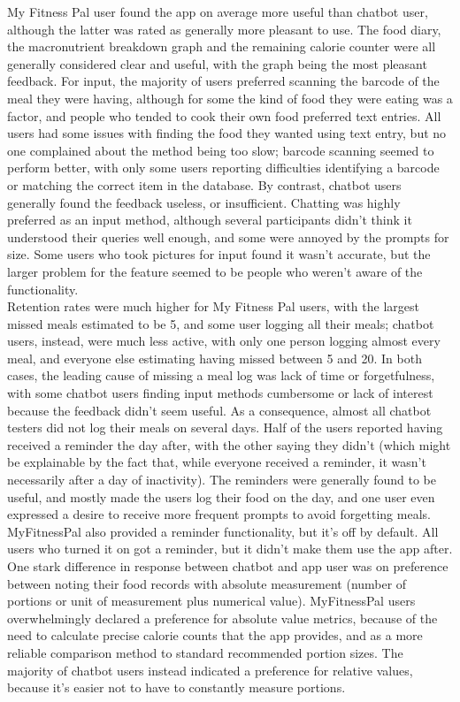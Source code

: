 My Fitness Pal user found the app on average more useful than chatbot user, although the latter was rated as generally more pleasant to use. The food diary, the macronutrient breakdown graph and the remaining calorie counter were all generally considered clear and useful, with the graph being the most pleasant feedback. For input, the majority of users preferred scanning the barcode of the meal they were having, although for some the kind of food they were eating was a factor, and people who tended to cook their own food preferred text entries. All users had some issues with finding the food they wanted using text entry, but no one complained about the method being too slow; barcode scanning seemed to perform better, with only some users reporting difficulties identifying a barcode or matching the correct item in the database. By contrast, chatbot users generally found the feedback useless, or insufficient. Chatting was highly preferred as an input method, although several participants didn't think it understood their queries well enough, and some were annoyed by the prompts for size. Some users who took pictures for input found it wasn't accurate, but the larger problem for the feature seemed to be people who weren't aware of the functionality. \\
Retention rates were much higher for My Fitness Pal users, with the largest missed meals estimated to be 5, and some user logging all their meals; chatbot users, instead, were much less active, with only one person logging almost every meal, and everyone else estimating having missed between 5 and 20. In both cases, the leading cause of missing a meal log was lack of time or forgetfulness, with some chatbot users finding input methods cumbersome or lack of interest because the feedback didn't seem useful. As a consequence, almost all chatbot testers did not log their meals on several days. Half of the users reported having received a reminder the day after, with the other saying they didn't (which might be explainable by the fact that, while everyone received a reminder, it wasn't necessarily after a day of inactivity). The reminders were generally found to be useful, and mostly made the users log their food on the day, and one user even expressed a desire to receive more frequent prompts to avoid forgetting meals. MyFitnessPal also provided a reminder functionality, but it's off by default. All users who turned it on got a reminder, but it didn't make them use the app after. \\
One stark difference in response between chatbot and app user was on preference between noting their food records with absolute measurement (number of portions or unit of measurement plus numerical value). MyFitnessPal users overwhelmingly declared a preference for absolute value metrics, because of the need to calculate precise calorie counts that the app provides, and as a more reliable comparison method to standard recommended portion sizes. The majority of chatbot users instead indicated a preference for relative values, because it's easier not to have to constantly measure portions. \\
